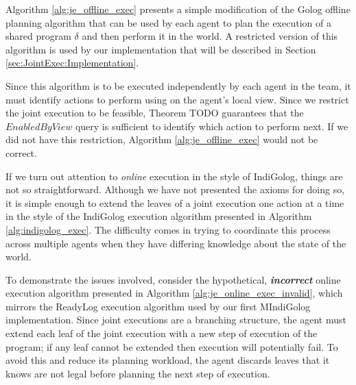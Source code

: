 Algorithm \ref{alg:je_offline_exec} presents a simple modification
of the Golog offline planning algorithm that can be used by each agent
to plan the execution of a shared program $\delta$ and then perform
it in the world. A restricted version of this algorithm is used by
our implementation that will be described in Section \ref{sec:JointExec:Implementation}.

Since this algorithm is to be executed independently by each agent
in the team, it must identify actions to perform using on the agent's
local view. Since we restrict the joint execution to be feasible,
Theorem TODO guarantees that the $EnabledByView$ query is sufficient
to identify which action to perform next. If we did not have this
restriction, Algorithm \ref{alg:je_offline_exec} would not be correct.

If we turn out attention to \emph{online} execution in the style of
IndiGolog, things are not so straightforward. Although we have not
presented the axioms for doing so, it is simple enough to extend the
leaves of a joint execution one action at a time in the style of the
IndiGolog execution algorithm presented in Algorithm \ref{alg:indigolog_exec}.
The difficulty comes in trying to coordinate this process across multiple
agents when they have differing knowledge about the state of the world.

To demonstrate the issues involved, consider the hypothetical, \textbf{\emph{incorrect}}
online execution algorithm presented in Algorithm \ref{alg:je_online_exec_invalid},
which mirrors the ReadyLog execution algorithm used by our first MIndiGolog
implementation. Since joint executions are a branching structure,
the agent must extend each leaf of the joint execution with a new
step of execution of the program; if any leaf cannot be extended then
execution will potentially fail. To avoid this and reduce its planning
workload, the agent discards leaves that it knows are not legal before
planning the next step of execution.

